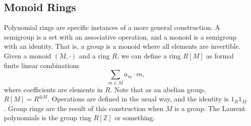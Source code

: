 \subsection{Monoid Rings}
Polynomial rings are specific instances of a more general construction. A semigroup is a set with an associative operation, and a monoid is a semigroup with an identity. That is, a group is a monoid where all elements are invertible. Given a monoid $(M,\cdot )$ and a ring $R$, we can define a ring $R[M]$ as formal finite linear combinations
\[
	\sum_{m\in M} a_m \cdot m
,\]
where coefficients are elements in $R$. Note that as an abelian group, $R[M]=R^{\oplus M}$. Operations are defined in the usual way, and the identity is $1_R1_M$. Group rings are the result of this construction when $M$ is a group. The Laurent polynomials is the group ring $R[\mathbb{Z}]$ or something.
